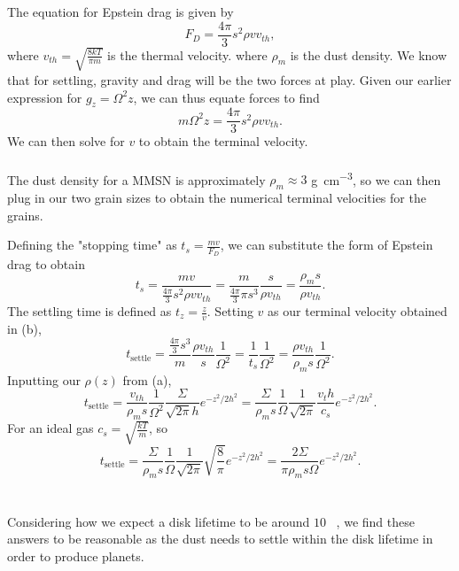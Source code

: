 \documentclass[11pt]{article}
\newenvironment{tight_enumerate}{
    \begin{enumerate}[label=(\alph*)]
    \setlength{\itemsep}{3pt}
    \setlength{\parskip}{0pt}}
    {\end{enumerate}}
\begin{document}
\begin{tight_enumerate}
\newpage
\item The equation for Epstein drag is given by 
\[F_D = \frac{4\pi}{3}s^2\rho v v_{th},\]
where $v_{th} = \sqrt{\frac{8kT}{\pi m}}$ is the thermal velocity. 
where $\rho_m$ is the dust density. We know that for settling, gravity and drag will be the two forces at play. Given our earlier expression for $g_z = \Omega^2 z$, we can thus equate forces to find 
\[m\Omega^2 z = \frac{4\pi}{3}s^2 \rho v v_{th}.\]
We can then solve for $v$ to obtain the terminal velocity.\\
\\
The dust density for a MMSN is approximately $\rho_m \approx 3$ \si{\gram\per\cubic\centi\meter}, so we can then plug in our two grain sizes to obtain the numerical terminal velocities for the grains.\\

\item Defining the "stopping time" as $t_s = \frac{mv}{F_D}$, we can substitute the form of Epstein drag to obtain 
\[t_s = \frac{mv}{\frac{4\pi}{3}s^2 \rho v v_{th}} = \frac{m}{\frac{4\pi}{3}\pi s^3}\frac{s}{\rho v_{th}} = \frac{\rho_m s}{\rho v_{th}}.\]
The settling time is defined as $t_z = \frac{z}{v}$. Setting $v$ as our terminal velocity obtained in (b), 
\[t_\text{settle} = \frac{\frac{4\pi}{3}s^3}{m}\frac{\rho v_{th}}{s}\frac{1}{\Omega^2} = \frac{1}{t_s}\frac{1}{\Omega^2} = \frac{\rho v_{th}}{\rho_m s}\frac{1}{\Omega^2}.\]
Inputting our $\rho(z)$ from (a),
\[t_\text{settle} = \frac{v_{th}}{\rho_m s}\frac{1}{\Omega^2}\frac{\Sigma}{\sqrt{2\pi}h}e^{-z^2/2h^2} = \frac{\Sigma}{\rho_m s}\frac{1}{\Omega}\frac{1}{\sqrt{2\pi}}\frac{v_th}{c_s}e^{-z^2/2h^2}.\]
For an ideal gas $c_s = \sqrt{\frac{kT}{m}}$, so 
\[t_\text{settle} = \frac{\Sigma}{\rho_m s}\frac{1}{\Omega}\frac{1}{\sqrt{2\pi}}\sqrt{\frac{8}{\pi}}e^{-z^2/2h^2} = \frac{2\Sigma}{\pi \rho_m s\Omega}e^{-z^2/2h^2}.\]
\\
\\
Considering how we expect a disk lifetime to be around $10$ \si{\mega\year}, we find these answers to be reasonable as the dust needs to settle within the disk lifetime in order to produce planets.


\end{tight_enumerate}
\end{document}

